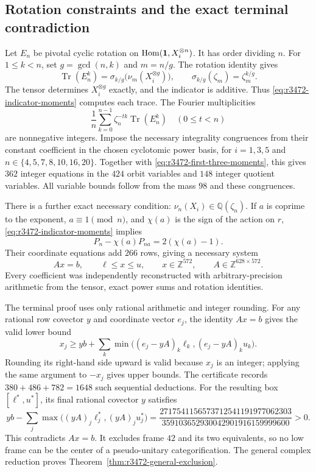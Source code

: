 \subsection{Rotation constraints and the exact terminal contradiction}
Let $E_n$ be pivotal cyclic rotation on
$\operatorname{Hom}(\mathbf1,X_i^{\otimes n})$. It has order dividing $n$.
For $1\leq k<n$, set $g=\gcd(n,k)$ and $m=n/g$. The rotation identity
\cite[Theorem~5.1 and its proof]{NgHigherPivotal} gives
\[
 \operatorname{Tr}(E_n^k)
   =\sigma_{k/g}\bigl(\nu_m(X_i^{\otimes g})\bigr),
 \qquad \sigma_{k/g}(\zeta_m)=\zeta_m^{k/g}.
\]
The tensor determines $X_i^{\otimes g}$ exactly, and the indicator is
additive. Thus \eqref{eq:r3472-indicator-moments} computes each trace.
The Fourier multiplicities
\[
 \frac1n\sum_{k=0}^{n-1}\zeta_n^{-tk}\operatorname{Tr}(E_n^k)
 \quad(0\leq t<n)
\]
are nonnegative integers. Impose the necessary integrality congruences
from their constant coefficient in the chosen cyclotomic power basis,
for $i=1,3,5$ and
$n\in\{4,5,7,8,10,16,20\}$. Together with
\eqref{eq:r3472-first-three-moments}, this gives $362$ integer equations
in the $424$ orbit variables and $148$ integer quotient variables.
All variable bounds follow from the mass $98$ and these congruences.

There is a further exact necessary condition:
$\nu_n(X_i)\in\mathbb Q(\zeta_n)$.
If $a$ is coprime to the exponent, $a\equiv1\pmod n$, and
$\chi(a)$ is the sign of the action on $r$,
\eqref{eq:r3472-indicator-moments} implies
\[
 P_n-\chi(a)P_{na}=2(\chi(a)-1).
\]
Their coordinate equations add $266$ rows, giving a necessary system
\begin{equation}\label{eq:r3472-integer-system}
 A x=b,\qquad \ell\leq x\leq u,\qquad x\in\mathbb Z^{572},
 \qquad A\in\mathbb Z^{628\times572}.
\end{equation}
Every coefficient was independently reconstructed with arbitrary-precision
arithmetic from the tensor, exact power sums and rotation identities.

The terminal proof uses only rational arithmetic and integer rounding.
For any rational row covector $y$ and coordinate vector $e_j$, the
identity $Ax=b$ gives the valid lower bound
\[
 x_j\geq yb+
 \sum_k\min\bigl((e_j-yA)_k\ell_k,(e_j-yA)_ku_k\bigr).
\]
Rounding its right-hand side upward is valid because $x_j$ is an integer;
applying the same argument to $-x_j$ gives upper bounds.
The certificate records $380+486+782=1648$ such sequential deductions.
For the resulting box $[\ell^*,u^*]$, its final rational covector $y$ satisfies
\[
 yb-\sum_j\max\bigl((yA)_j\ell_j^*,(yA)_ju_j^*\bigr)
 =\frac{2717541156573712541191977062303}
        {359103652930042901916159999600}>0.
\]
This contradicts $Ax=b$. It excludes frame $42$ and its two equivalents,
so no low frame can be the center of a pseudo-unitary categorification.
The general complex reduction proves
Theorem~\ref{thm:r3472-general-exclusion}.

